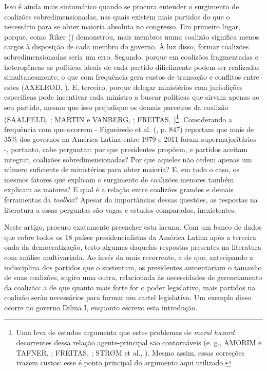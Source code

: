 Isso é ainda mais sintomático quando se procura entender o surgimento de coalizões sobredimensionadas, nas quais existem mais partidos do que o necessário para se obter maioria absoluta no congresso. Em primeiro lugar, porque, como Riker (\citeyear{riker1962}) demonstrou, mais membros numa coalizão significa menos cargos à disposição de cada membro do governo. À luz disso, formar coalizões sobredimensionadas seria um erro. Segundo, porque em coalizões fragmentadas e heterogêneas as políticas ideais de cada partido dificilmente podem ser realizadas simultaneamente, o que com frequência gera custos de transação e conflitos entre estes (AXELROD, \citeyear{axelrod1970}). E, terceiro, porque delegar ministérios com jurisdições específicas pode incentivar cada ministro a buscar políticas que sirvam apenas ao seu partido, mesmo que isso prejudique os demais parceiros da coalizão (SAALFELD, \citeyear{saalfeld2000}; MARTIN e VANBERG, \citeyear{martin2011}; FREITAS, \citeyear{freitas2012})\footnote{Uma leva de estudos argumenta que estes problemas de \textit{moral hazard} decorrentes dessa relação agente-principal são contornáveis (e. g., AMORIM e TAFNER, \citeyear{neto2002}; FREITAS, \citeyear{freitas2012}; STR\O{}M et al., \citeyear{strom2010}). Mesmo assim, essas correções trazem custos: esse é ponto principal do argumento aqui utilizado.}. Considerando a frequência com que ocorrem - Figueiredo et al. (\citeyear{figueiredo2012}, p. 847) reportam que mais de 35\% dos governos na América Latina entre 1979 e 2011 foram supermajoritários -, portanto, cabe perguntar: por que presidentes propõem, e partidos aceitam integrar, coalizões sobredimensionadas? Por que aqueles não cedem apenas um número suficiente de ministérios para obter maioria? E, em todo o caso, os mesmos fatores que explicam o surgimento de coalizões menores também explicam as maiores? E qual é a relação entre coalizões grandes e demais ferramentas da \textit{toolbox}? Apesar da importâncias dessas questões, as respostas na literatura a essas perguntas são vagas e estudos comparados, inexistentes.
 
Neste artigo, procuro exatamente preencher esta lacuna. Com um banco de dados que cobre todos os 18 países presidencialistas da América Latina após a terceira onda da democratização, testo algumas daquelas respostas presentes na literatura com análise multivariada. Ao invés da mais recorrente, a de que, antecipando a indisciplina dos partidos que o sustentam, os presidentes aumentariam o tamanho de suas coalizões, sugiro uma outra, relacionada às necessidades de gerenciamento da coalizão: a de que quanto mais forte for o poder legislativo, mais partidos na coalizão serão necessários para formar um cartel legislativo. Um exemplo disso ocorre no governo Dilma I, enquanto escrevo esta introdução. 

